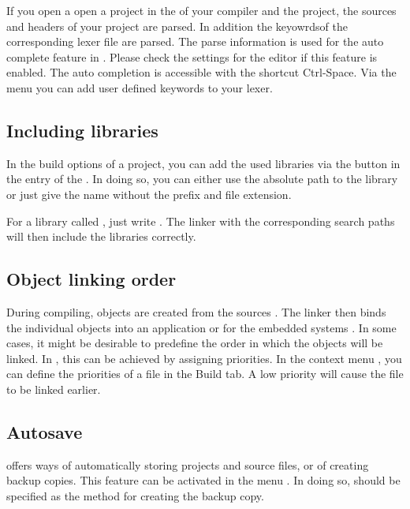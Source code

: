 If you open a open a project in \codeblocks the  of your compiler and the project, the sources and headers of your project are parsed. In addition the keyowrdsof the corresponding lexer file are parsed. The parse information is used for the auto complete feature in \codeblocks. Please check the settings for the editor if this feature is enabled. The auto completion is accessible with the shortcut Ctrl-Space. Via the menu  you can add user defined keywords to your lexer.

\subsection{Including libraries}

In the build options of a project, you can add the used libraries via the  button in the  entry of the . In doing so, you can either use the absolute path to the library or just give the name without the  prefix and file extension.


For a library called , just write . The linker with the corresponding search paths will then include the libraries correctly.

\subsection{Object linking order}

During compiling, objects  are created from the sources . The linker then binds the individual objects into an application  or for the embedded systems . In some cases, it might be desirable to predefine the order in which the objects will be linked. In \codeblocks, this can be achieved by assigning priorities. In the context menu , you can define the priorities of a file in the Build tab. A low priority will cause the file to be linked earlier.

\subsection{Autosave}

\codeblocks offers ways of automatically storing projects and source files, or of creating backup copies. This feature can be activated in the menu . In doing so,  should be specified as the method for creating the backup copy.


